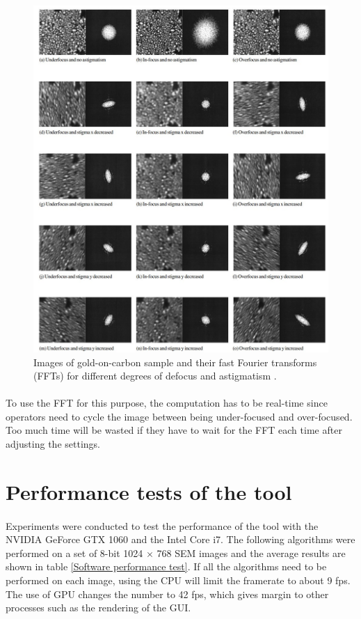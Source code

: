\documentclass[12pt, twocolumn]{report}
\begin{document}
\begin{figure}
    \centering
    \includegraphics[width=1.05\textwidth]{Figures/SEM astigmatism and FFT.jpg}
    \caption{Images of gold-on-carbon sample and their fast Fourier transforms (FFTs) for different degrees of defocus and astigmatism \cite{SEM correction algorithm}.}
    \label{SEM astigmatism}
\end{figure}

\paragraph{}
To use the FFT for this purpose, the computation has to be real-time since operators need to cycle the image between being under-focused and over-focused. Too much time will be wasted if they have to wait for the FFT each time after adjusting the settings.

\section{Performance tests of the tool}
\paragraph{}
Experiments were conducted to test the performance of the tool with the NVIDIA GeForce GTX 1060 and the Intel Core i7. The following algorithms were performed on a set of 8-bit 1024 $\times$ 768 SEM images and the average results are shown in table \ref{Software performance test}. If all the algorithms need to be performed on each image, using the CPU will limit the framerate to about 9 fps. The use of GPU changes the number to 42 fps, which gives margin to other processes such as the rendering of the GUI.
\end{document}
